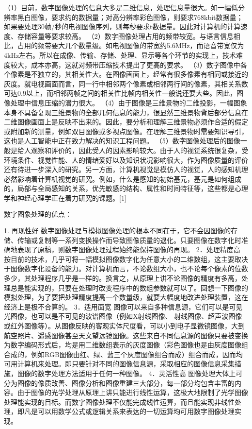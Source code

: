 \documentclass[18pt, twoside, a4paper, dvipdfm]{book}
\begin{document}
	（1）目前，数字图像处理的信息大多是二维信息，处理信息量很大。如一幅低分辨率黑白图像，要求约的数据量；对高分辨率彩色图像，则要求768kbit数据量；如果要处理30帧/秒的电视图像序列，则每秒要求t数据量。因此对计算机的计算速度、存储容量等要求较高。 
（2）数字图像处理占用的频带较宽。与语言信息相比，占用的频带要大几个数量级。如电视图像的带宽约5.6MHz，而语音带宽仅为4kHz左右。所以在成像、传输、存储、处理、显示等各个环节的实现上，技术难度较大，成本亦高，这就对频带压缩技术提出了更高的要求。 
（3）数字图像中各个像素是不独立的，其相关性大。在图像画面上，经常有很多像素有相同或接近的灰度。就电视画面而言，同一行中相邻两个像素或相邻两行间的像素，其相关系数可达0.9以上，而相邻两帧之间的相关性比帧内相关性一般说还要大些。因此，图像处理中信息压缩的潜力很大。 
（4）由于图像是三维景物的二维投影，一幅图象本身不具备复现三维景物的全部几何信息的能力，很显然三维景物背后部分信息在二维图像画面上是反映不出来的。因此，要分析和理解三维景物必须作合适的假定或附加新的测量，例如双目图像或多视点图像。在理解三维景物时需要知识导引，这也是人工智能中正在致力解决的知识工程问题。 
（5）数字图像处理后的图像一般是给人观察和评价的，因此受人的因素影响较大。由于人的视觉系统很复杂，受环境条件、视觉性能、人的情绪爱好以及知识状况影响很大，作为图像质量的评价还有待进一步深入的研究。另一方面，计算机视觉是模仿人的视觉，人的感知机理必然影响着计算机视觉的研究。例如，什么是感知的初始基元，基元是如何组成的，局部与全局感知的关系，优先敏感的结构、属性和时间特征等，这些都是心理学和神经心理学正在着力研究的课题。[1]

数字图象处理的优点：

	1. 再现性好 数字图像处理与模拟图像处理的根本不同在于，它不会因图像的存储、传输或复制等一系列变换操作而导致图像质量的退化。只要图像在数字化时准确地表现了原稿，则数字图像处理过程始终能保持图像的再现。 
2．处理精度高 按目前的技术，几乎可将一幅模拟图像数字化为任意大小的二维数组，这主要取决于图像数字化设备的能力。对计算机而言，不论数组大小，也不论每个像素的位数多少，其处理程序几乎是一样的。换言之，从原理上讲不论图像的精度有多高，处理总是能实现的，只要在处理时改变程序中的数组参数就可以了。回想一下图像的模拟处理，为了要把处理精度提高一个数量级，就要大幅度地改进处理装置，这在经济上是极不合算的。 
3．适用面宽 图像可以来自多种信息源，它们可以是可见光图像，也可以是不可见的波谱图像（例如X射线图像、 射线图像、超声波图像或红外图像等）。从图像反映的客观实体尺度看，可以小到电子显微镜图像，大到航空照片、遥感图像甚至天文望远镜图像。这些来自不同信息源的图像只要被变换为数字编码形式后，均是用二维数组表示的灰度图像（彩色图像也是由灰度图像组合成的，例如RGB图像由红、绿、蓝三个灰度图像组合而成）组合而成，因而均可用计算机来处理。即只要针对不同的图像信息源，采取相应的图像信息采集措施，图像的数字处理方法适用于任何一种图像。 
4．灵活性高 图像处理大体上可分为图像的像质改善、图像分析和图像重建三大部分，每一部分均包含丰富的内容。由于图像的光学处理从原理上讲只能进行线性运算，这极大地限制了光学图像处理能实现的目标。而数字图像处理不仅能完成线性运算，而且能实现非线性处理，即凡是可以用数学公式或逻辑关系来表达的一切运算均可用数字图像处理实现。
\end{document}
